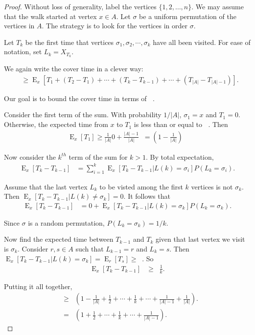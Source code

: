\documentclass[12pt]{article}
\theoremstyle{definition}
\DeclareMathOperator{\E}{\mathrm{E}}		     %
\DeclareMathOperator{\tcov}{t_\textrm{cov}}      %
\DeclareMathOperator{\tmina}{t_\textrm{min}^A}   %
\begin{document}
\begin{proof}
Without loss of generality, label the vertices $\{1, 2, \ldots, n\}$.
We may assume that the walk started at vertex $x \in A$.
Let $\sigma$ be a uniform permutation of the vertices in $A$.
The strategy is to look for the vertices in order $\sigma$.

Let $T_k$ be the first time that vertices $\sigma_1, \sigma_2, \cdots, \sigma_k$
have all been visited.
For ease of notation, set $L_k = X_{T_k}$.

We again write the cover time in a clever way:
\begin{align}
\tcov &\geq \E_x[T_1 + (T_2 - T_1) + \cdots + 
(T_k - T_{k-1}) + \cdots + (T_{|A|} - T_{|A|-1})] . \nonumber
\end{align}

Our goal is to bound the cover time in terms of $\tmina$.

Consider the first term of the sum.
With probability $1/|A|$, $\sigma_1 = x$ and $T_1=0$.
Otherwise, the expected time from $x$ to $T_1$ is less than or equal to
$\tmina$.
Then
\begin{align}
\E_x[T_1] \geq \frac{1}{|A|}0 + \frac{|A| -1}{|A|} \tmina
= \left(1 - \frac{1}{|A|} \right) \tmina \nonumber
\end{align}

Now consider the $k^{th}$ term of the sum for $k > 1$.
By total expectation,
\begin{align}
\E_x[T_k - T_{k-1}] &=
\sum_{i=1}^k \E_x[T_k - T_{k-1} | L(k) = \sigma_i]
P(L_k = \sigma_i). \nonumber 
\end{align}

Assume that the last vertex $L_k$ to be visted among the first
$k$ vertices is not $\sigma_k$.
Then $\E_x[T_k-T_{k-1}|L(k) \neq \sigma_k] = 0$.
It follows that
\begin{align}
\E_x[T_k - T_{k-1}] &= 0 +
\E_x[T_k - T_{k-1} | L(k) = \sigma_k]
P(L_k = \sigma_k). \nonumber 
\end{align}

Since $\sigma$ is a random permutation, $P(L_k = \sigma_k) = 1/k$.

Now find the expected time between $T_{k-1}$ and $T_{k}$
given that last vertex we visit is $\sigma_k$.
Consider $r, s \in A$ such that $L_{k-1} = r$ and $L_k = s$.
Then $\E_x[T_k - T_{k-1} | L(k) = \sigma_k] = \E_r[T_s] \geq \tmina$.
So
\begin{align}
\E_x[T_k - T_{k-1}] &\geq
\tmina \frac{1}{k}. \nonumber 
\end{align}

Putting it all together,
\begin{align}
\tcov &\geq \tmina \left( 1 - \frac{1}{|A|}+ \frac{1}{2} + \cdots + \frac{1}{k} 
+ \cdots + \frac{1}{|A|-1} + \frac{1}{|A|}\right). \nonumber \\
&= \tmina \left( 1 + \frac{1}{2} + \cdots + \frac{1}{k} 
+ \cdots + \frac{1}{|A|-1} \right). \nonumber
\end{align}
\end{proof}
\end{document}
